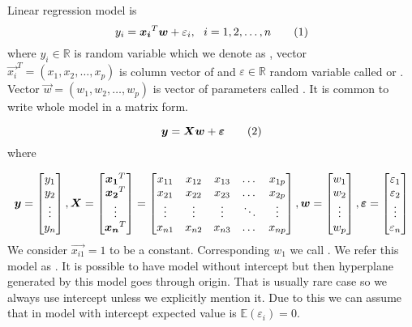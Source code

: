 \begin{definition}\label{definition:lr_model}
    Linear regression model is 
    \[ 
        y_i = \vec{x_i}^T\vec{w} + \varepsilon_i\\, \ \  i = 1,2,\ldots,n \numberthis
    \]
where $y_i \in \mathbb{R}$ is random variable which we denote as , vector $\vec{x_i}^T = (x_1, x_2, \ldots, x_p)$ is column vector of  and $\varepsilon \in \mathbb{R}$ random variable called  or . Vector $\vec{w} = (w_1, w_2, \ldots, w_p)$ is vector of parameters called  . It is common to write whole model in a matrix form. 

\[ 
    \vec{y} = \vec{X}\vec{w} + \vec{\varepsilon}    \numberthis
\] where

\[ 
\vec{y} = \begin{bmatrix}
    y_{1} \\
    y_{2} \\
    \vdots \\
    y_{n}
  \end{bmatrix}\\,
 \vec{X} = \begin{bmatrix}
    \vec{x_1}^T \\
    \vec{x_2}^T \\
    \vdots \\
    \vec{x_n}^T
\end{bmatrix}
=
\begin{bmatrix}
    x_{11} & x_{12} & x_{13} & \dots  & x_{1p} \\
    x_{21} & x_{22} & x_{23} & \dots  & x_{2p} \\
    \vdots & \vdots & \vdots & \ddots & \vdots \\
    x_{n1} & x_{n2} & x_{n3} & \dots  & x_{np}
\end{bmatrix}\\,
\vec{w} = \begin{bmatrix}
    w_{1} \\
    w_{2} \\
    \vdots \\
    w_{p}
  \end{bmatrix}\\,
  \vec{\varepsilon} = \begin{bmatrix}
    \varepsilon_{1} \\
    \varepsilon_{2} \\
    \vdots \\
    \varepsilon_{n}
  \end{bmatrix}
\]
We consider $\vec{x_{i1}} = 1$ to be a constant. Corresponding $w_{1}$ we call . We refer this model as . It is possible to have model without intercept but then hyperplane generated by this model goes through origin. That is usually rare case so we always use intercept unless we explicitly mention it. Due to this we can assume that in model with intercept expected value is  $\mathbb{E}(\varepsilon_i) = 0$.
\end{definition}


